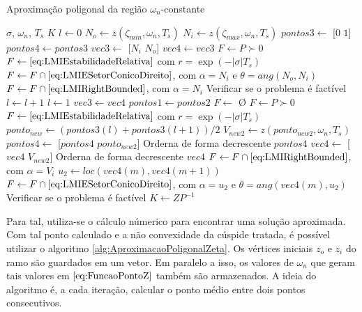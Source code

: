 \begin{algorithm}[ht!]
  \caption{Aproximação poligonal da região $\omega_n$-constante}\label{alg:AproximacaoPoligonalWn}
  \begin{algorithmic}[1]
    \Require $\sigma$, $\omega_n$, $T_s$
    \Ensure $K$
    \State $l \gets 0$
    \State $N_o \gets z(\zeta_{min},\omega_n,T_s)$
    \State $N_i \gets z(\zeta_{max},\omega_n,T_s)$
    \State $pontos3 \gets$ [$0$ $1$]
    \State $pontos4 \gets pontos3$
    \State $vec3 \gets$ [$N_i$ $N_o$]
    \State $vec4 \gets vec3$
    \State $F \gets P \succ 0$
    \State $F \gets \eqref{eq:LMIEstabilidadeRelativa}$ com $r = \exp{\left(-|\sigma|T_s\right)}$ 
    \State $F \gets F \cap \eqref{eq:LMIESetorConicoDireito}$, com $\alpha = N_i$ e $\theta = ang(N_o,N_i)$ 
    \State $F \gets F \cap \eqref{eq:LMIRightBounded}$, com $\alpha = N_i$ 
    \State Verificar se o problema é factível
        \State $l \gets l + 1$
      \Else
        \State $l \gets 1$
        \State $vec3 \gets vec4$
        \State $pontos1 \gets pontos2$
      \EndIf
        \State $F \gets$ \O {}
        \State $F \gets P \succ 0$
        \State $F \gets \eqref{eq:LMIEstabilidadeRelativa}$ com $r = \exp{\left(-|\sigma|T_s\right)}$ 
        \State $ponto_{new} \gets (pontos3(l)+pontos3(l+1))/2$
        \State $V_{new2} \gets z(ponto_{new2}, \omega_n, T_s)$
        \State $pontos4 \gets$ [$pontos4$ $ponto_{new2}$]
        \State Orderna de forma decrescente $pontos4$
        \State $vec4 \gets$ [$vec4$ $V_{new2}$]
        \State Orderna de forma decrescente $vec4$
        \State $F \gets F \cap \eqref{eq:LMIRightBounded}$, com $\alpha = V_i$ 
          \State $u_2 \gets loc(vec4(m),vec4(m+1))$
          \State $F \gets F \cap \eqref{eq:LMIESetorConicoDireito}$, com $\alpha = u_2$ e $\theta = ang(vec4(m),u_2)$
        \EndFor
        \State Verificar se o problema é factível
    \EndWhile
    \State $K \gets ZP^{-1}$
  \end{algorithmic}
\end{algorithm}

Para tal, utiliza-se o cálculo númerico para encontrar uma solução aproximada. Com tal ponto calculado e a não convexidade da cúspide tratada, é possível utilizar o algoritmo \ref{alg:AproximacaoPoligonalZeta}. Os vértices iniciais $z_o$ e $z_i$ do ramo são guardados em um vetor. Em paralelo a isso, os valores de $\omega_n$ que geram tais valores em $\eqref{eq:FuncaoPontoZ}$ também são armazenados. A ideia do algoritmo é, a cada iteração, calcular o ponto médio entre dois pontos consecutivos.

